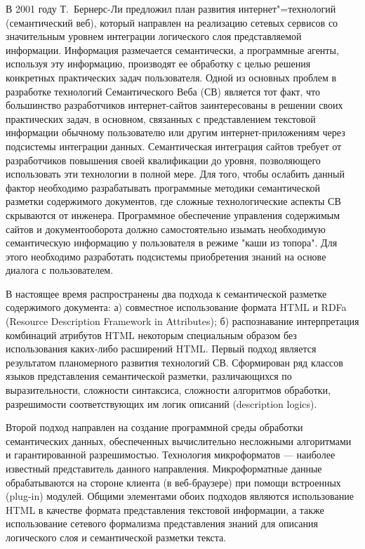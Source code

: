 \documentclass[utf8]{../IncArticle}
\begin{document}
\introduction{}

В 2001 году Т.~Бернерс-Ли предложил план развития интернет"=технологий
(семантический веб), который направлен на реализацию сетевых сервисов
со значительным уровнем интеграции логического слоя представляемой
информации.  Информация размечается семантически, а программные
агенты, используя эту информацию, производят ее обработку с целью
решения конкретных практических задач пользователя. Одной из основных
проблем в разработке технологий Семантического Веба (СВ) является тот факт,
что большинство разработчиков интернет-сайтов заинтересованы в решении
своих практических задач, в основном, связанных с представлением
текстовой информации обычному пользователю или другим
интернет-приложениям через подсистемы интеграции данных.
Семантическая интеграция сайтов требует от разработчиков повышения
своей квалификации до уровня, позволяющего использовать эти технологии
в полной мере.  Для того, чтобы ослабить данный фактор необходимо
разрабатывать программные методики семантической разметки содержимого
документов, где сложные технологические аспекты СВ
скрываются от инженера.  Программное обеспечение управления содержимым
сайтов и документооборота должно самостоятельно изымать необходимую
семантическую информацию у пользователя в режиме "каши из топора".
Для этого необходимо разработать подсистемы приобретения знаний на
основе диалога с пользователем.

В настоящее время распространены два подхода к семантической разметке содержимого
документа: а) совместное использование формата HTML и RDFa (Resource
Description Framework in Attributes); б)
распознавание интерпретация комбинаций атрибутов HTML некоторым
специальным образом без использования каких-либо расширений HTML.  Первый подход является
результатом планомерного развития технологий СВ.  Сформирован ряд
классов языков представления семантической
разметки, различающихся по выразительности, сложности синтаксиса,
сложности алгоритмов обработки, разрешимости соответствующих им
логик описаний (description logics).

Второй подход направлен на создание программной среды обработки
семантических данных, обеспеченных вычислительно несложными
алгоритмами и гарантированной разрешимостью.  Технология микроформатов
\cite{b2:2} --- наиболее известный представитель данного направления.
Микроформатные данные обрабатываются на стороне клиента (в
веб-браузере) при помощи встроенных (plug-in) модулей.  Общими
элементами обоих подходов являются использование HTML в качестве
формата представления текстовой информации, а также использование сетевого
формализма представления знаний для описания логического
слоя и семантической разметки текста.
\end{document}

